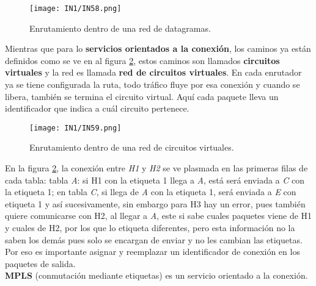 \documentclass[
	12pt, %
	fleqn, %
	a4paper, %
	oneside, %
]{LegrandOrangeBook}
\begin{document}
\begin{figure}[H]
\centering
\texttt{[image: IN1/IN58.png]}
\caption{Enrutamiento dentro de una red de datagramas.}
\label{fig:enru datagrama}
\end{figure}
Mientras que para lo \textbf{servicios orientados a la conexión}, los caminos ya están definidos como se ve en al figura \ref{fig:circ virt}, estos caminos son llamados \textbf{circuitos virtuales} y la red es llamada \textbf{red de circuitos virtuales}. En cada enrutador ya se tiene configurada la ruta, todo tráfico fluye por esa conexión y cuando se libera, también se termina el circuito virtual. Aquí cada paquete lleva un identificador que indica a cuál circuito pertenece.
\begin{figure}[H]
\centering
\texttt{[image: IN1/IN59.png]}
\caption{Enrutamiento dentro de una red de circuitos virtuales.}
\label{fig:circ virt}
\end{figure}
En la figura \ref{fig:circ virt}, la conexión entre \textit{H1} y \textit{H2} se ve plasmada en las primeras filas de cada tabla: tabla \textit{A}: si H1 con la etiqueta 1 llega a \textit{A}, está será enviada a \textit{C} con la etiqueta 1; en tabla \textit{C}, si llega de \textit{A} con la etiqueta 1, será enviada a \textit{E} con etiqueta 1 y así sucesivamente, sin embargo para H3 hay un error, pues también quiere comunicarse con H2, al llegar a \textit{A}, este si sabe cuales paquetes viene de H1 y cuales de H2, por los que lo etiqueta diferentes, pero esta información no la saben los demás pues solo se encargan de enviar y no les cambian las etiquetas. Por eso es importante asignar y reemplazar un identificador de conexión en los paquetes de salida.\\\textbf{MPLS} (conmutación mediante etiquetas) es un servicio orientado a la conexión. 
\end{document}
